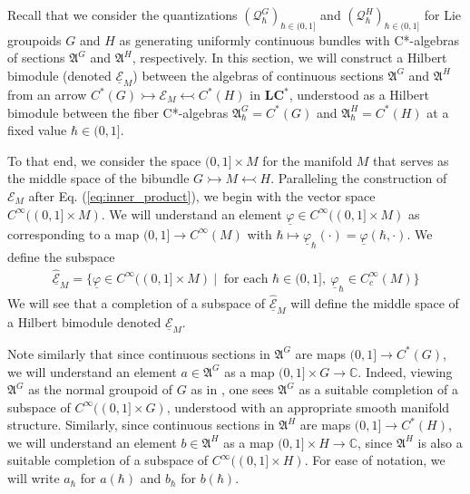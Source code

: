 \documentclass[sn-mathphys,Numbered]{sn-jnl}
\begin{document}
Recall that we consider the quantizations $(\mathcal{Q}_\hbar^G)_{\hbar\in (0,1]}$ and $(\mathcal{Q}_\hbar^H)_{\hbar\in (0,1]}$ for Lie groupoids $G$ and $H$ as generating uniformly continuous bundles with C*-algebras of sections $\mathfrak{A}^G$ and $\mathfrak{A}^H$, respectively.  In this section, we will construct a Hilbert bimodule (denoted $\underline{\mathcal{E}}_M$) between the algebras of continuous sections $\mathfrak{A}^G$ and $\mathfrak{A}^H$ from an arrow $C^*(G)\rightarrowtail \mathcal{E}_M\leftarrowtail C^*(H)$ in $\mathbf{LC^*}$, understood as a Hilbert bimodule between the fiber C*-algebras $\mathfrak{A}^G_\hbar=C^*(G)$ and $\mathfrak{A}^H_\hbar=C^*(H)$ at a fixed value $\hbar\in (0,1]$.

To that end, we consider the space $(0,1]\times M$ for the manifold $M$ that serves as the middle space of the bibundle $G\rightarrowtail M\leftarrowtail H$.  Paralleling the construction of $\mathcal{E}_M$ after Eq. (\ref{eq:inner_product}), we begin with the vector space $C^\infty((0,1]\times M)$.   We will understand an element $\underline{\varphi}\in C^\infty((0,1]\times M)$ as corresponding to a map $(0,1]\to C^\infty(M)$ with $\hbar\mapsto \underline{\varphi}_\hbar(\cdot) = \underline{\varphi}(\hbar,\cdot)$. We define the subspace
\begin{align}
    \widehat{\underline{\mathcal{E}}}_M = \Big\{\underline{\varphi}\in C^\infty((0,1]\times M)\ \Big|\ \text{ for each } \hbar\in(0,1],\  \underline{\varphi}_\hbar\in C_c^\infty(M) \Big\}
\end{align}
We will see that a completion of a subspace of $\widehat{\underline{\mathcal{E}}}_M$ will define the middle space of a Hilbert bimodule denoted $\underline{\mathcal{E}}_M$.  

Note similarly that since continuous sections in $\mathfrak{A}^G$ are maps $(0,1]\to C^*(G)$, we will understand an element $a\in \mathfrak{A}^G$ as a map $(0,1]\times G\to \mathbb{C}$.  Indeed, viewing $\mathfrak{A}^G$ as the normal groupoid of $G$ as in \citet{La99}, one sees $\mathfrak{A}^G$ as a suitable completion of a subspace of $C^\infty((0,1]\times G)$, understood with an appropriate smooth manifold structure.  Similarly, since continuous sections in $\mathfrak{A}^H$ are maps $(0,1]\to C^*(H)$, we will understand an element $b\in \mathfrak{A}^H$ as a map $(0,1]\times H\to \mathbb{C}$, since $\mathfrak{A}^H$ is also a suitable completion of a subspace of $C^\infty((0,1]\times H)$.  For ease of notation, we will write $a_\hbar$ for $a(\hbar)$ and $b_\hbar$ for $b(\hbar)$.
\end{document}
